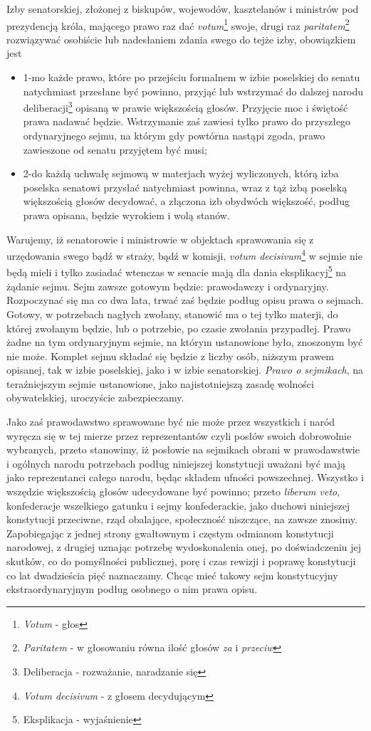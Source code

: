 \documentclass{book}
\begin{document}
 Izby senatorskiej, złożonej z biskupów, wojewodów, kasztelanów i ministrów pod prezydencją króla, mającego prawo raz dać \textit{votum}\footnote{\textit{Votum} - głos} swoje, drugi raz \textit{paritatem}\footnote{\textit{Paritatem} - w głosowaniu równa ilość głosów \textit{za} i \textit{przeciw}} rozwiązywać osobiście lub nadesłaniem zdania swego do tejże izby, obowiązkiem jest 
\begin{itemize}
\item 1-mo każde prawo, które po przejściu formalnem w izbie poselskiej do senatu natychmiast przesłane być powinno, przyjąć lub wstrzymać do dalszej narodu deliberacji\footnote{Deliberacja - rozważanie, naradzanie się} opisaną w prawie większością głosów. Przyjęcie moc i świętość prawa nadawać będzie. Wstrzymanie zaś zawiesi tylko prawo do przyszłego ordynaryjnego sejmu, na którym gdy powtórna nastąpi zgoda, prawo zawieszone od senatu przyjętem być musi; 
\item 2-do każdą uchwałę sejmową w materjach wyżej wyliczonych, którą izba poselska senatowi przysłać natychmiast powinna,  wraz z tąż izbą poselską większością głosów decydować, a złączona izb obydwóch większość, podług prawa opisana, będzie wyrokiem i wolą stanów.  
\end{itemize}
Warujemy, iż senatorowie i ministrowie w objektach sprawowania się z urzędowania swego bądź w straży, bądź w komisji, \textit{votum decisivum}\footnote{\textit{Votum decisivum} - z głosem decydującym} w sejmie nie będą mieli i tylko zasiadać wtenczas w senacie mają dla dania eksplikacyj\footnote{Eksplikacja - wyjaśnienie} na żądanie sejmu. Sejm zawsze gotowym będzie: prawodawczy i ordynaryjny. Rozpoczynać się ma co dwa lata, trwać zaś będzie podług opisu prawa o sejmach.  Gotowy, w potrzebach nagłych zwołany, stanowić ma o tej tylko materji, do której zwołanym będzie, lub o potrzebie, po czasie zwołania przypadłej.  Prawo żadne na tym ordynaryjnym sejmie, na którym ustanowione było, znoszonym być nie może. Komplet sejmu składać się będzie z liczby osób, niższym prawem opisanej, tak w izbie poselskiej, jako i w izbie senatorskiej. \textit{Prawo o sejmikach}, na teraźniejszym sejmie ustanowione, jako najistotniejszą zasadę wolności obywatelskiej, uroczyście zabezpieczamy. 

 Jako zaś prawodawstwo sprawowane być nie może przez wszystkich i naród wyręcza się w tej mierze przez reprezentantów czyli posłów swoich dobrowolnie wybranych, przeto stanowimy, iż posłowie na sejmikach obrani w prawodawstwie i ogólnych narodu potrzebach podług niniejszej konstytucji uważani być mają jako reprezentanci całego narodu, będąc składem ufności powszechnej. Wszystko i wszędzie większością głosów udecydowane być powinno; przeto \textit{liberum veto}, konfederacje wszelkiego gatunku i sejmy konfederackie, jako duchowi niniejszej konstytucji przeciwne, rząd obalające, społeczność niszczące, na zawsze znosimy. Zapobiegając z jednej strony gwałtownym i częstym odmianom konstytucji narodowej, z drugiej uznając potrzebę wydoskonalenia onej, po doświadczeniu jej skutków,   co do pomyślności publicznej, porę i czas rewizji i poprawę konstytucji co lat dwadzieścia pięć naznaczamy.  Chcąc mieć takowy sejm konstytucyjny ekstraordynaryjnym podług osobnego o nim prawa opisu. 
\end{document}

